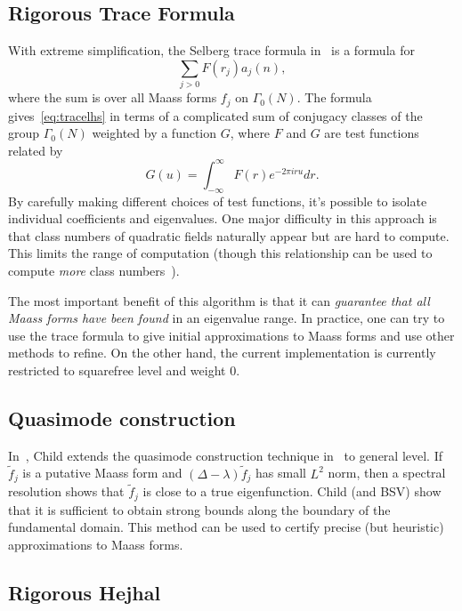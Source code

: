 \documentclass[11pt,reqno,oneside]{amsart}
\theoremstyle{plain}
\theoremstyle{definition}
\begin{document}
\subsection{Rigorous Trace Formula}

With extreme simplification, the Selberg trace formula in~\cite{seymour2022rigorous}
is a formula for
\begin{equation}\label{eq:tracelhs}
  \sum_{j > 0} F(r_j) a_j(n),
\end{equation}
where the sum is over all Maass forms $f_j$ on $\Gamma_0(N)$.
The formula gives~\eqref{eq:tracelhs} in terms of a complicated sum of
conjugacy classes of the group $\Gamma_0(N)$ weighted by a function $G$, where
$F$ and $G$ are test functions related by
\begin{equation}
  G(u) = \int_{-\infty}^\infty F(r) e^{- 2 \pi i r u} dr.
\end{equation}
By carefully making different choices of test functions, it's possible to
isolate individual coefficients and eigenvalues.
One major difficulty in this approach is that class numbers of quadratic fields
naturally appear but are hard to compute.
This limits the range of computation (though this relationship can
be used to compute \emph{more} class numbers~\cite{booker2024unconditional}).

The most important benefit of this algorithm is that it can \emph{guarantee
that all Maass forms have been found} in an eigenvalue range.
In practice, one can try to use the trace formula to give initial
approximations to Maass forms and use other methods to refine.
On the other hand, the current implementation is currently restricted to
squarefree level and weight $0$.


\subsection{Quasimode construction}

In~\cite{child22}, Child extends the quasimode construction technique
in~\cite{booker2006effective} to general level.
If $\widetilde{f}_j$ is a putative Maass form and $(\Delta - \lambda)
\widetilde{f}_j$ has small $L^2$ norm, then a spectral resolution shows that
$\widetilde{f}_j$ is close to a true eigenfunction.
Child (and BSV) show that it is sufficient to obtain strong bounds along the
boundary of the fundamental domain.
This method can be used to certify precise (but heuristic) approximations to
Maass forms.


\subsection{Rigorous Hejhal}
\end{document}
